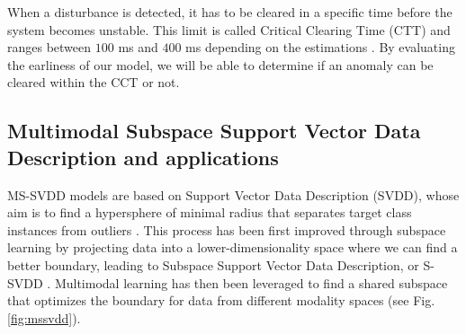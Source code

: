When a disturbance is detected, it has to be cleared in a specific time before the system becomes unstable. This limit is called Critical Clearing Time (CTT) and ranges between $100$ ms and $400$ ms depending on the estimations \cite{zheng2021psml} \cite{Wu2019} \cite{Banjar-Nahor20181183}. By evaluating the earliness of our model, we will be able to determine if an anomaly can be cleared within the CCT or not. 

\subsection{Multimodal Subspace Support Vector Data Description and applications}

MS-SVDD models are based on Support Vector Data Description (SVDD), whose aim is to find a hypersphere of minimal radius that separates target class instances from outliers \cite{Tax2004SupportVD}. This process has been first improved through subspace learning by projecting data into a lower-dimensionality space where we can find a better boundary, leading to Subspace Support Vector Data Description, or S-SVDD \cite{8545819}. Multimodal learning has then been leveraged to find a shared subspace that optimizes the boundary for data from different modality spaces (see Fig. \ref{fig:mssvdd}). 

